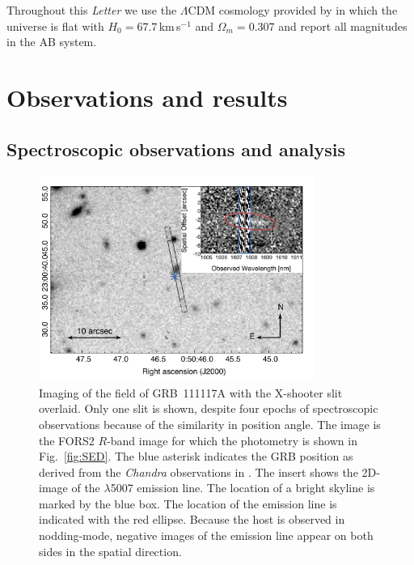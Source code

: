 \documentclass{aa}    %
\begin{document}
Throughout this \emph{Letter} we use the $\Lambda$CDM cosmology provided by
\citet{Planck2015} in which the universe is flat with $H_0 = 67.7$\,km\,s$^{-1}$
and $\Omega_m = 0.307$ and report all magnitudes in the AB system.


\section{Observations and results}

\subsection{Spectroscopic observations and analysis}

\begin{figure}
	\centering
	\includegraphics[width=9cm]{figures/GRB111117A_spec_obs2.pdf}
	\caption{Imaging of the field of GRB~111117A with the X-shooter slit overlaid. Only one slit is shown, despite four epochs of spectroscopic observations because of the similarity in position angle. The image is the FORS2 $R$-band image for which the photometry is shown in Fig.~\ref{fig:SED}. 
	The blue asterisk indicates the GRB position as derived from the \emph{Chandra} observations in \citet{Sakamoto2013}. The insert shows the 2D-image of the \oiii$\lambda$5007 emission line. The location of a bright skyline is marked by the blue box. The location of the emission line is indicated with the red ellipse. Because the host is observed in nodding-mode, negative images of the emission line appear on both sides in the spatial direction.}
	\label{fig:spec_setup}
\end{figure}
\end{document}
